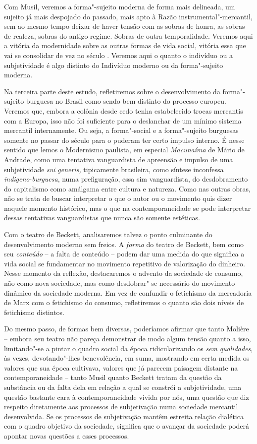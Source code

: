 Com Musil, veremos a forma"-sujeito moderna de forma mais delineada, um
sujeito já mais despojado do passado, mais apto à Razão
instrumental"-mercantil, sem ao mesmo tempo deixar de haver tensão com as
sobras de honra, as sobras de realeza, sobras do antigo regime. Sobras
de outra temporalidade. Veremos aqui a vitória da modernidade sobre as
outras formas de vida social, vitória essa que vai se consolidar de vez
no século . Veremos aqui o quanto o indivíduo ou a subjetividade é
algo distinto do Indivíduo moderno ou da forma"-sujeito moderna.

Na terceira parte deste estudo, refletiremos sobre o desenvolvimento da
forma"-sujeito burguesa no Brasil como sendo bem distinto do processo
europeu. Veremos que, embora a colônia desde cedo tenha estabelecido
trocas mercantis com a Europa, isso não foi suficiente para o deslanchar
de um mínimo sistema mercantil internamente. Ou seja, a forma"-social e a
forma"-sujeito burguesas somente no passar do século  para o 
puderam ter certo impulso interno. É nesse sentido que lemos o
Modernismo paulista, em especial \emph{Macunaíma} de Mário de Andrade,
como uma tentativa vanguardista de apreensão e impulso de uma
subjetividade \emph{sui} \emph{generis,} tipicamente brasileira, como
síntese inconfessa \emph{indigeno}-\emph{burguesa}, numa prefiguração,
essa sim vanguardista, do desdobramento do capitalismo como amálgama
entre cultura e natureza. Como nas outras obras, não se trata de buscar
interpretar o que o autor ou o movimento quis dizer naquele momento
histórico, mas o que na contemporaneidade se pode interpretar dessas
tentativas vanguardistas que nunca são somente estéticas.

Com o teatro de Beckett, analisaremos talvez o ponto culminante do
desenvolvimento moderno sem freios. A \emph{forma} do teatro de
Beckett, bem como seu
\emph{conteúdo} -- a falta de conteúdo -- podem dar uma medida do que
significa a vida social se fundamentar no movimento repetitivo de
valorização do dinheiro. Nesse momento da reflexão, destacaremos o
advento da sociedade de consumo, não como nova sociedade, mas como
desdobrar"-se necessário do movimento dinâmico da sociedade moderna. Em vez de
confundir o fetichismo da mercadoria de Marx com o fetichismo do
consumo, refletiremos o quanto são dois níveis de fetichismo distintos.

Do mesmo passo, de formas bem diversas, poderíamos afirmar que tanto
Molière -- embora seu teatro não pareça demonstrar de modo algum tensão
quanto a isso, limitando"-se a pintar o quadro social da época
ridicularizando os \emph{sem} \emph{qualidades}, às vezes,
devotando"-lhes benevolência, em suma, mostrando em certa medida os
valores que sua época cultivava, valores que já parecem paisagem
distante na contemporaneidade -- tanto Musil quanto Beckett tratam da
questão da substância ou da falta dela em relação a qual se constrói a
subjetividade, uma questão bastante cara à contemporaneidade vivida por
nós, uma questão que diz respeito diretamente aos processos de
subjetivação numa sociedade mercantil desenvolvida. Se os processos de
subjetivação mantêm estreita relação dialética com o quadro objetivo da
sociedade, significa que o avançar da sociedade poderá apontar novas
questões a esses processos.

